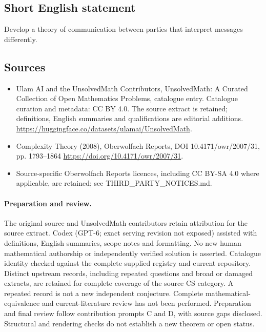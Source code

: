 \documentclass[11pt]{article}
\begin{document}
\subsection{Short English statement}
Develop a theory of communication between parties that interpret messages differently.
\subsection{Sources}
\begin{itemize}
\item[\hypertarget{source:statement:1}{S1}] Ulam AI and the UnsolvedMath Contributors, UnsolvedMath: A Curated Collection of Open Mathematics Problems, catalogue entry. Catalogue curation and metadata: CC BY 4.0. The source extract is retained; definitions, English summaries and qualifications are editorial additions.
\url{https://huggingface.co/datasets/ulamai/UnsolvedMath}.
\item[\hypertarget{source:statement:2}{S2}] Complexity Theory (2008), Oberwolfach Reports, DOI 10.4171/owr/2007/31, pp. 1793--1864
\url{https://doi.org/10.4171/owr/2007/31}.
\item Source-specific Oberwolfach Reports licences, including CC BY-SA 4.0 where applicable, are retained; see THIRD\_PARTY\_NOTICES.md.
\end{itemize}
\paragraph{Preparation and review.}
The original source and UnsolvedMath contributors retain attribution for the source extract. Codex (GPT-6; exact serving revision not exposed) assisted with definitions, English summaries, scope notes and formatting. No new human mathematical authorship or independently verified solution is asserted. Catalogue identity checked against the complete supplied registry and current repository. Distinct upstream records, including repeated questions and broad or damaged extracts, are retained for complete coverage of the source CS category. A repeated record is not a new independent conjecture. Complete mathematical-equivalence and current-literature review has not been performed. Preparation and final review follow contribution prompts C and D, with source gaps disclosed. Structural and rendering checks do not establish a new theorem or open status.
\label{end:statement}
\end{document}
